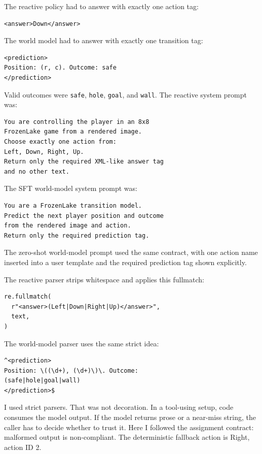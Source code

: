 \documentclass{article}
\newcommand{\code}[1]{\texttt{#1}}
\begin{document}
The reactive policy had to answer with exactly one action tag:

\begin{verbatim}
<answer>Down</answer>
\end{verbatim}

The world model had to answer with exactly one transition tag:

\begin{verbatim}
<prediction>
Position: (r, c). Outcome: safe
</prediction>
\end{verbatim}

Valid outcomes were \code{safe}, \code{hole}, \code{goal}, and \code{wall}. The reactive system prompt was:

\begin{verbatim}
You are controlling the player in an 8x8
FrozenLake game from a rendered image.
Choose exactly one action from:
Left, Down, Right, Up.
Return only the required XML-like answer tag
and no other text.
\end{verbatim}

The SFT world-model system prompt was:

\begin{verbatim}
You are a FrozenLake transition model.
Predict the next player position and outcome
from the rendered image and action.
Return only the required prediction tag.
\end{verbatim}

The zero-shot world-model prompt used the same contract, with one action name inserted into a user template and the required prediction tag shown explicitly.

The reactive parser strips whitespace and applies this fullmatch:

\begin{verbatim}
re.fullmatch(
  r"<answer>(Left|Down|Right|Up)</answer>",
  text,
)
\end{verbatim}

The world-model parser uses the same strict idea:

\begin{verbatim}
^<prediction>
Position: \((\d+), (\d+)\)\. Outcome:
(safe|hole|goal|wall)
</prediction>$
\end{verbatim}

I used strict parsers. That was not decoration. In a tool-using setup, code consumes the model output. If the model returns prose or a near-miss string, the caller has to decide whether to trust it. Here I followed the assignment contract: malformed output is non-compliant. The deterministic fallback action is Right, action ID 2.
\end{document}
